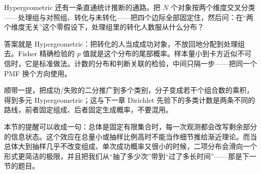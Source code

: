 Hypergeometric 还有一条直通统计推断的通路。把 \(N\) 个对象按两个维度交叉分类——处理组与对照组、转化与未转化——把四个边际全部固定住，然后问：在``两个维度无关''这个零假设下，处理组里的转化人数服从什么分布？

答案就是 Hypergeometric：把转化的人当成成功对象，不放回地分配到处理组去。Fisher 精确检验的 \(p\) 值就是这个分布的尾部概率。样本量小到卡方近似不可信时，它是标准做法。计数的分布和判断关联的检验，中间只隔一步——把同一个 PMF 换个方向使用。

顺带一提，把成功/失败的二分推广到多个类别，分子变成若干个组合数的乘积，得到多元 Hypergeometric；这与下一章 Dirichlet 先验下的多类计数是两条不同的路线，前者固定组成、后者固定生成概率，不要混用。

本节的提醒可以收成一句：总体是固定有限集合时，每一次观测都会改写剩余部分的信息状态。这个效应在总量小或抽样比例高时不能当作细节推给渐近理论。而当总体大到抽样几乎不改变组成、单次成功概率又很小的时候，二项分布会滑向一个形式更简洁的极限，并且把我们从``抽了多少次''带到``过了多长时间''——那是下一节的题目。
